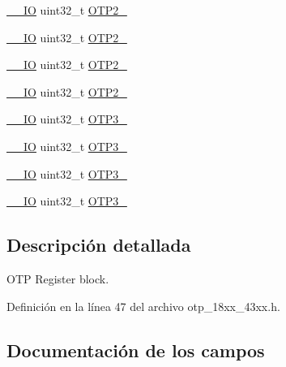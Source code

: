 \begin{DoxyCompactItemize}
\item 
\hyperlink{core__sc300_8h_aec43007d9998a0a0e01faede4133d6be}{\+\_\+\+\_\+\+IO} uint32\+\_\+t \hyperlink{struct_l_p_c___o_t_p___t_a0670ccc03779f75566481b736c921990}{O\+T\+P2\+\_}
\item 
\hyperlink{core__sc300_8h_aec43007d9998a0a0e01faede4133d6be}{\+\_\+\+\_\+\+IO} uint32\+\_\+t \hyperlink{struct_l_p_c___o_t_p___t_ab63df09dc1a83420a8498f97d355336c}{O\+T\+P2\+\_}
\item 
\hyperlink{core__sc300_8h_aec43007d9998a0a0e01faede4133d6be}{\+\_\+\+\_\+\+IO} uint32\+\_\+t \hyperlink{struct_l_p_c___o_t_p___t_a85c218d777687ad7283dc42891ba4998}{O\+T\+P2\+\_}
\item 
\hyperlink{core__sc300_8h_aec43007d9998a0a0e01faede4133d6be}{\+\_\+\+\_\+\+IO} uint32\+\_\+t \hyperlink{struct_l_p_c___o_t_p___t_aad584dcee6c9c36e7626347a3ef93550}{O\+T\+P2\+\_}
\item 
\hyperlink{core__sc300_8h_aec43007d9998a0a0e01faede4133d6be}{\+\_\+\+\_\+\+IO} uint32\+\_\+t \hyperlink{struct_l_p_c___o_t_p___t_a2eecdce259e3a21e548a5af3fea112b6}{O\+T\+P3\+\_}
\item 
\hyperlink{core__sc300_8h_aec43007d9998a0a0e01faede4133d6be}{\+\_\+\+\_\+\+IO} uint32\+\_\+t \hyperlink{struct_l_p_c___o_t_p___t_aabc2d34f70cbb023181caa7382a0531a}{O\+T\+P3\+\_}
\item 
\hyperlink{core__sc300_8h_aec43007d9998a0a0e01faede4133d6be}{\+\_\+\+\_\+\+IO} uint32\+\_\+t \hyperlink{struct_l_p_c___o_t_p___t_a796f6f9df01508aa48307936ed3b5b81}{O\+T\+P3\+\_}
\item 
\hyperlink{core__sc300_8h_aec43007d9998a0a0e01faede4133d6be}{\+\_\+\+\_\+\+IO} uint32\+\_\+t \hyperlink{struct_l_p_c___o_t_p___t_a3b6537dec86bbda90d637344cc470f2d}{O\+T\+P3\+\_}
\end{DoxyCompactItemize}


\subsection{Descripción detallada}
O\+TP Register block. 

Definición en la línea 47 del archivo otp\+\_\+18xx\+\_\+43xx.\+h.



\subsection{Documentación de los campos}
